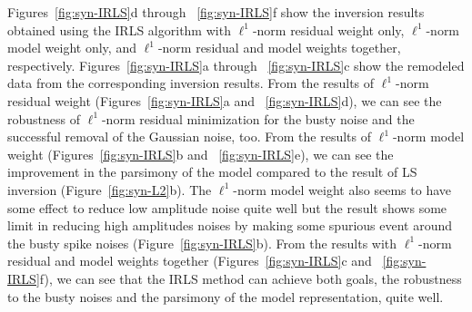 Figures~\ref{fig:syn-IRLS}d through ~\ref{fig:syn-IRLS}f show the inversion results 
obtained using the IRLS algorithm with $\ell^1$-norm residual weight only, 
$\ell^1$-norm model weight only, and $\ell^1$-norm residual and model weights together, respectively.  
Figures~\ref{fig:syn-IRLS}a through ~\ref{fig:syn-IRLS}c show the remodeled data 
from the corresponding inversion results.
From the results of $\ell^1$-norm residual weight (Figures~\ref{fig:syn-IRLS}a and ~\ref{fig:syn-IRLS}d),
we can see the robustness of $\ell^1$-norm residual minimization for the busty noise
and the successful removal of the Gaussian noise, too.
From the results of $\ell^1$-norm model weight (Figures~\ref{fig:syn-IRLS}b and ~\ref{fig:syn-IRLS}e),
we can see the improvement in the parsimony of the model compared 
to the result of LS inversion (Figure~\ref{fig:syn-L2}b).
The $\ell^1$-norm model weight also seems to have some effect to reduce low amplitude noise quite well
but the result shows some limit in reducing high amplitudes noises by making some spurious event around
the busty spike noises (Figure~\ref{fig:syn-IRLS}b).
From the results with $\ell^1$-norm residual and model weights together 
(Figures~\ref{fig:syn-IRLS}c and ~\ref{fig:syn-IRLS}f),
we can see that the IRLS method can achieve both goals, the robustness to the busty noises
and the parsimony of the model representation, quite well.

